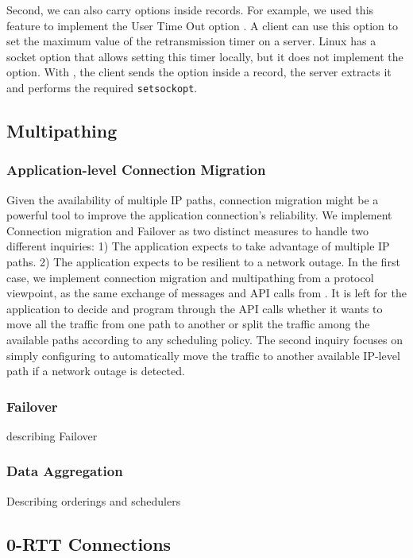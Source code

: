 Second, we can also carry \tcp options inside \tls records. For example, we used
this feature to implement the \tcp User Time Out option \cite{rfc5482}. A client
can use this option to set the maximum value of the retransmission
timer on a server. Linux \tcp has a socket option that allows setting
this timer locally, but it does not implement the option. With \tcpls, the client sends the option inside a \tls record, the server extracts it
and performs the required \texttt{setsockopt}.

\subsection{Multipathing}

\subsubsection{Application-level Connection Migration}
\label{sec:connmigr}

Given the availability of multiple IP paths, connection migration might be a
powerful tool to improve the application connection's reliability.  We
implement Connection migration and Failover as two distinct measures to handle
two different inquiries: 1) The application expects to take advantage of multiple
IP paths. 2) The application expects to be resilient to a network outage. In the
first case, we implement connection migration and multipathing from a
protocol viewpoint, as the same exchange of messages and API calls from \tcpls.
It is left for the application to decide and program
through the API calls whether it wants to move all the traffic from one path to
another or split the traffic among the available paths according to any
scheduling policy. The second
inquiry focuses on simply configuring \tcpls to automatically move the traffic to
another available IP-level path if a network outage is detected.


\subsubsection{Failover}
describing Failover

\subsubsection{Data Aggregation}
Describing orderings and schedulers

\subsection{0-RTT Connections}
